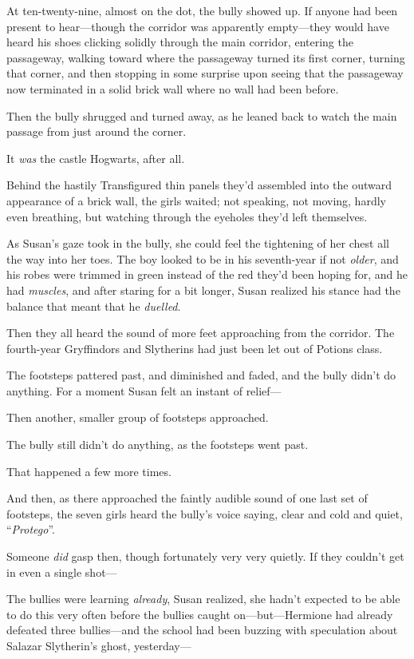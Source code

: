\later

At ten-twenty-nine, almost on the dot, the bully showed up. If anyone had been present to hear—though the corridor was apparently empty—they would have heard his shoes clicking solidly through the main corridor, entering the passageway, walking toward where the passageway turned its first corner, turning that corner, and then stopping in some surprise upon seeing that the passageway now terminated in a solid brick wall where no wall had been before.

Then the bully shrugged and turned away, as he leaned back to watch the main passage from just around the corner.

It \emph{was} the castle Hogwarts, after all.

Behind the hastily Transfigured thin panels they’d assembled into the outward appearance of a brick wall, the girls waited; not speaking, not moving, hardly even breathing, but watching through the eyeholes they’d left themselves.

As Susan’s gaze took in the bully, she could feel the tightening of her chest all the way into her toes. The boy looked to be in his seventh-year if not \emph{older}, and his robes were trimmed in green instead of the red they’d been hoping for, and he had \emph{muscles}, and after staring for a bit longer, Susan realized his stance had the balance that meant that he \emph{duelled}.

Then they all heard the sound of more feet approaching from the corridor. The fourth-year Gryffindors and Slytherins had just been let out of Potions class.

The footsteps pattered past, and diminished and faded, and the bully didn’t do anything. For a moment Susan felt an instant of relief—

Then another, smaller group of footsteps approached.

The bully still didn’t do anything, as the footsteps went past.

That happened a few more times.

And then, as there approached the faintly audible sound of one last set of footsteps, the seven girls heard the bully’s voice saying, clear and cold and quiet, “\emph{Protego}”.

Someone \emph{did} gasp then, though fortunately very very quietly. If they couldn’t get in even a single shot—

The bullies were learning \emph{already}, Susan realized, she hadn’t expected \SPHEW{} to be able to do this very often before the bullies caught on—but—Hermione had already defeated three bullies—and the school had been buzzing with speculation about Salazar Slytherin’s ghost, yesterday—

